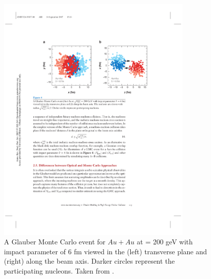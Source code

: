 \begin{figure}[htbp]
\begin{center}
\includegraphics[width=0.85\textwidth]{figures/theory/glauberMC}
\caption{A Glauber Monte Carlo event for $Au+Au$ at \sqrtsnn = 200 geV with impact parameter of 6 fm viewed in the (left) transverse plane and (right) along the beam axis. Darker circles represent the participating nucleons. Taken from \cite{doi:10.1146/annurev.nucl.57.090506.123020}. }
\label{fig:qgp_form}
\end{center}
\end{figure}




